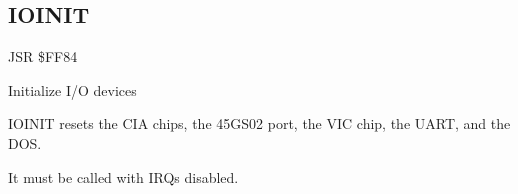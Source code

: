 \subsection{IOINIT}
\label{KERNAL Jump Table!IOINIT}
\begin{description}[leftmargin=2cm,style=nextline]
    \item [Address:] JSR \$FF84
    \item [Description:] Initialize I/O devices
    \item [Remarks:]
        IOINIT resets the CIA chips, the 45GS02 port, the VIC chip, the UART, and the DOS.

        It must be called with IRQs disabled.
    \item [Example:]
\end{description}



\newpage
